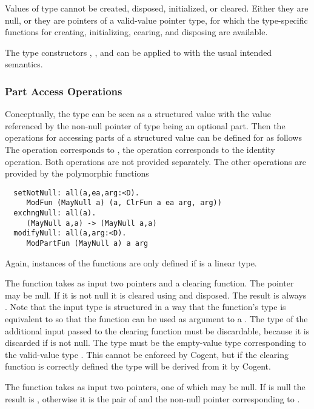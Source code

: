 Values of type  cannot be created, disposed, initialized, or cleared. Either they are null, or they are pointers of
a valid-value pointer type, for which the type-specific functions for creating, initializing, cearing, and disposing are available.

The type constructors , , and  can be applied to  with the usual intended
semantics.

\subsubsection{Part Access Operations}

Conceptually, the type  can be seen as a structured value with the value referenced by the non-null pointer of type  being
an optional part. Then the operations for accessing parts of a structured value can be defined for  as follows
The operation  corresponds to , the operation  corresponds to the
identity operation. Both operations are not provided separately. The other operations are provided
by the polymorphic functions
\begin{verbatim}
  setNotNull: all(a,ea,arg:<D). 
     ModFun (MayNull a) (a, ClrFun a ea arg, arg))
  exchngNull: all(a).
     (MayNull a,a) -> (MayNull a,a)
  modifyNull: all(a,arg:<D).
     ModPartFun (MayNull a) a arg
\end{verbatim}
Again, instances of the functions are only defined if  is a linear type.

The function  takes as input two pointers and a clearing function. The pointer  may be null. 
If it is not null it is cleared using  and disposed. The result is always . Note that the input type is
structured in a way that the function's type is equivalent to  so that the function can be used
as argument to a . The type  of the additional input passed to the clearing function must be discardable, because
it is discarded if  is not null. The type  must be the empty-value type corresponding to the valid-value type . This 
cannot be enforced by Cogent, but if the clearing function is correctly defined the type  will be derived from it by Cogent.

The function  takes as input two pointers, one of which may be null. If  is null the result is
, otherwise it is the pair of  and the non-null pointer corresponding to .

